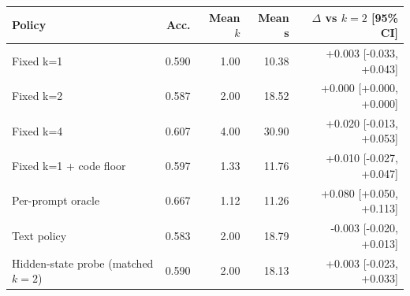 \begin{tabular}{lrrrr}
\toprule
Policy & Acc. & Mean $k$ & Mean s & $\Delta$ vs $k{=}2$ [95\% CI] \\
\midrule
Fixed k=1 & 0.590 & 1.00 & 10.38 & +0.003 [-0.033, +0.043] \\
Fixed k=2 & 0.587 & 2.00 & 18.52 & +0.000 [+0.000, +0.000] \\
Fixed k=4 & 0.607 & 4.00 & 30.90 & +0.020 [-0.013, +0.053] \\
Fixed k=1 + code floor & 0.597 & 1.33 & 11.76 & +0.010 [-0.027, +0.047] \\
Per-prompt oracle & 0.667 & 1.12 & 11.26 & +0.080 [+0.050, +0.113] \\
Text policy & 0.583 & 2.00 & 18.79 & -0.003 [-0.020, +0.013] \\
Hidden-state probe (matched $k{=}2$) & 0.590 & 2.00 & 18.13 & +0.003 [-0.023, +0.033] \\
\bottomrule
\end{tabular}
